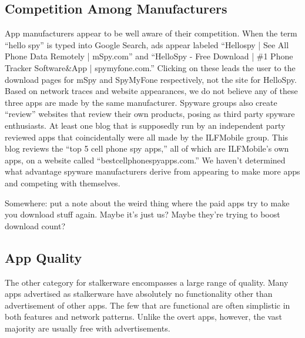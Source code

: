 \documentclass[acmtog]{acmart}
\begin{document}
\subsection{Competition Among Manufacturers}

App manufacturers appear to be well aware of their competition. When the term 
``hello spy'' is typed into Google Search, ads appear labeled ``Hellospy | See 
All Phone Data Remotely | mSpy.com'' and ``HelloSpy - Free Download | \#1 Phone 
Tracker Software\&App | spymyfone.com.'' Clicking on these leads the user to 
the download pages for mSpy and SpyMyFone respectively, not the site for 
HelloSpy. Based on network traces and website appearances, we do not believe 
any of these three apps are made by the same manufacturer. Spyware groups also 
create “review” websites that review their own products, posing as third party 
spyware enthusiasts. At least one blog that is supposedly run by 
an independent party reviewed apps that coincidentally were all made by the 
ILFMobile group\cite{noauthor_best_nodate}. This blog reviews the 
“top 5 cell phone spy apps,” all of which are ILFMobile’s own apps, on a 
website called “bestcellphonespyapps.com.” We haven’t determined what advantage 
spyware manufacturers derive from appearing to make more apps and competing 
with themselves.

Somewhere: put a note about the weird thing where the paid apps try to make you 
download stuff again. Maybe it's just us? Maybe they're trying to boost 
download count?



\subsection{App Quality}

The other category for stalkerware encompasses a large range of quality. Many 
apps advertised as stalkerware have absolutely no functionality other than 
advertisement of other apps. The few that are functional are often simplistic 
in both features and network patterns. Unlike the overt apps, however, the vast 
majority are usually free with advertisements. 
\end{document}

